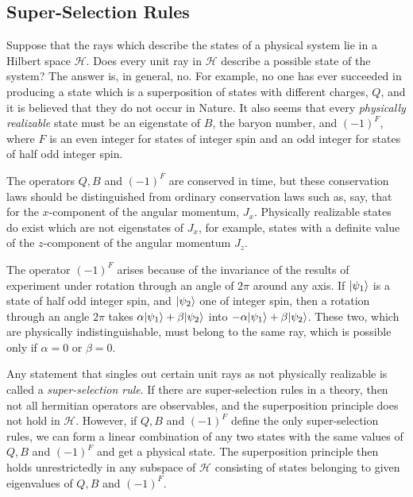 \subsection{Super-Selection Rules}\label{sec:ch1-super-selection-rules}

Suppose that the rays which describe the states of a physical system lie in a
Hilbert space \(\mathcal H\). Does every unit ray in \(\mathcal H\) describe a
possible state of the system? The answer is, in general, no. For example, no
one has ever succeeded in producing a state which is a superposition of states
with different charges, \(Q\), and it is believed that they do not occur in
Nature. It also seems that every \emph{physically realizable} state must be an
eigenstate of \(B\), the baryon number, and \((-1)^F\), where \(F\) is an even
integer for states of integer spin and an odd integer for states of half odd
integer spin.

The operators \(Q,B\) and \((-1)^F\) are conserved in time, but these
conservation laws should be distinguished from ordinary conservation laws
such as, say, that for the \(x\)-component of the angular momentum, \(J_x\).
Physically realizable states do exist which are not eigenstates of \(J_x\),
for example, states with a definite value of the \(z\)-component of the
angular momentum \(J_z\).

The operator \((-1)^F\) arises because of the invariance of the results of
experiment under rotation through an angle of \(2\pi\) around any axis. If
\(\lvert \psi_1\rangle\) is a state of half odd integer spin, and \(\lvert \psi_2\rangle\) one
of integer spin, then a rotation through an angle \(2\pi\) takes
\(\alpha\lvert \psi_1\rangle+\beta\lvert \psi_2\rangle\) into
\(-\alpha\lvert \psi_1\rangle+\beta\lvert \psi_2\rangle\). These two, which are physically
indistinguishable, must belong to the same ray, which is possible only if
\(\alpha=0\) or \(\beta=0\).

Any statement that singles out certain unit rays as not physically realizable
is called a \emph{super-selection rule}. If there are super-selection rules in
a theory, then not all hermitian operators are observables, and the
superposition principle does not hold in \(\mathcal H\). However, if \(Q,B\)
and \((-1)^F\) define the only super-selection rules, we can form a linear
combination of any two states with the same values of \(Q,B\) and \((-1)^F\)
and get a physical state. The superposition principle then holds
unrestrictedly in any subspace of \(\mathcal H\) consisting of states
belonging to given eigenvalues of \(Q,B\) and \((-1)^F\).


